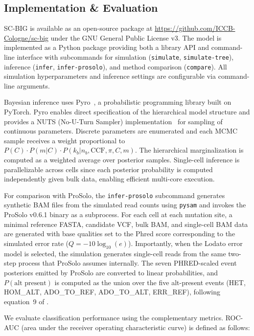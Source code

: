 \documentclass[10pt]{article}
\begin{document}
\subsection{Implementation \& Evaluation}

SC-BIG is available as an open-source package at \url{https://github.com/ICCB-Cologne/sc-big} under the GNU General Public License v3.
The model is implemented as a Python package providing both a library API and command-line interface with subcommands for simulation (\texttt{simulate}, \texttt{simulate-tree}), inference (\texttt{infer}, \texttt{infer-prosolo}), and method comparison (\texttt{compare}).
All simulation hyperparameters and inference settings are configurable via command-line arguments.

Bayesian inference uses Pyro~\cite{bingham2019}, a probabilistic programming library built on PyTorch.
Pyro enables direct specification of the hierarchical model structure and provides a NUTS (No-U-Turn Sampler) implementation~\cite{hoffman2011} for sampling of continuous parameters.
Discrete parameters are enumerated and each MCMC sample receives a weight proportional to $P(C) \cdot P(m|C) \cdot P(k_b | n_b, \text{CCF}, \pi, C, m)$.
The hierarchical marginalization is computed as a weighted average over posterior samples.
Single-cell inference is parallelizable across cells since each posterior probability is computed independently given bulk data, enabling efficient multi-core execution.

For comparison with ProSolo, the \texttt{infer-prosolo} subcommand generates synthetic BAM files from the simulated read counts using \texttt{pysam} and invokes the ProSolo v0.6.1 binary as a subprocess.
For each cell at each mutation site, a minimal reference FASTA, candidate VCF, bulk BAM, and single-cell BAM data are generated with base qualities set to the Phred score corresponding to the simulated error rate ($Q = -10\log_{10}(e)$).
Importantly, when the Lodato error model is selected, the simulation generates single-cell reads from the same two-step process that ProSolo assumes internally.
The seven PHRED-scaled event posteriors emitted by ProSolo are converted to linear probabilities, and $P(\text{alt present})$ is computed as the union over the five alt-present events (HET, HOM\_ALT, ADO\_TO\_REF, ADO\_TO\_ALT, ERR\_REF), following equation~9 of \textcite{lahnemann2021}.

We evaluate classification performance using the complementary metrics.
ROC-AUC (area under the receiver operating characteristic curve) is defined as follows:
\end{document}
